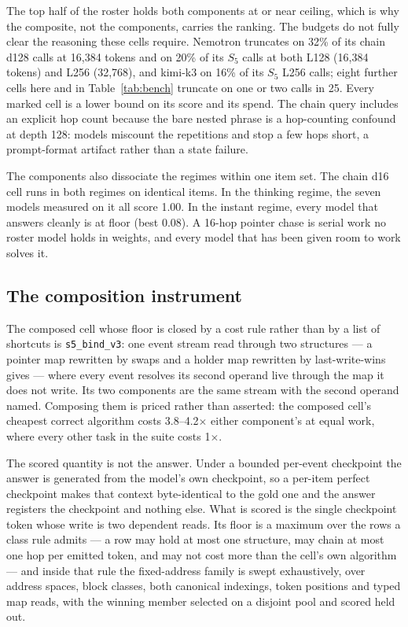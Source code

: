 \documentclass[11pt]{article}
\newcommand{\Sfive}{$S_5$}
\newcommand{\code}[1]{\texttt{#1}}
\begin{document}
The top half of the roster holds both components at or near ceiling, which is why the
composite, not the components, carries the ranking. The budgets do not fully clear the reasoning
these cells require. Nemotron truncates on 32\% of its chain d128 calls at 16{,}384 tokens and on 20\% of
its \Sfive{} calls at both L128 (16{,}384 tokens) and L256 (32{,}768), and kimi-k3 on 16\% of
its \Sfive{} L256 calls; eight further cells here and in Table~\ref{tab:bench} truncate on one
or two calls in 25. Every marked cell is a lower bound on its score and its spend. The chain query includes an explicit hop
count because the bare nested phrase is a hop-counting confound at depth 128: models miscount
the repetitions and stop a few hops short, a prompt-format artifact rather than a state
failure.

The components also dissociate the regimes within one item set. The chain d16 cell runs in
both regimes on identical items. In the thinking regime, the seven models measured on it all
score 1.00. In the instant regime, every model that answers cleanly is at floor (best 0.08). A 16-hop pointer chase is
serial work no roster model holds in weights, and every model that has been given room to work
solves it.

\subsection{The composition instrument}

The composed cell whose floor is closed by a cost rule rather than by a list of shortcuts is
\code{s5\_bind\_v3}: one event stream read through two structures --- a pointer map rewritten by
swaps and a holder map rewritten by last-write-wins gives --- where every event resolves its
second operand live through the map it does not write. Its two components are the same stream
with the second operand named. Composing them is priced rather than asserted: the composed
cell's cheapest correct algorithm costs 3.8--4.2$\times$ either component's at equal work, where
every other task in the suite costs 1$\times$.

The scored quantity is not the answer. Under a bounded per-event checkpoint the answer is
generated from the model's own checkpoint, so a per-item perfect checkpoint makes that context
byte-identical to the gold one and the answer registers the checkpoint and nothing else. What is
scored is the single checkpoint token whose write is two dependent reads. Its floor is a maximum
over the rows a class rule admits --- a row may hold at most one structure, may chain at most one
hop per emitted token, and may not cost more than the cell's own algorithm --- and inside that
rule the fixed-address family is swept exhaustively, over address spaces, block classes, both
canonical indexings, token positions and typed map reads, with the winning member selected on a
disjoint pool and scored held out.
\end{document}
